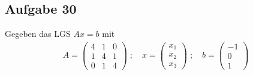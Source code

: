 \subsection*{Aufgabe 30}
Gegeben das LGS $A x = b$ mit
\begin{align}
\label{eq-A}
  A = \begin{pmatrix}4&1&0\\1&4&1\\0&1&4\end{pmatrix} \; ;\quad
  x = \begin{pmatrix}x_1\\x_2\\x_3\end{pmatrix} \; ;\quad
  b = \begin{pmatrix}-1\\0\\1\end{pmatrix}
\end{align}
